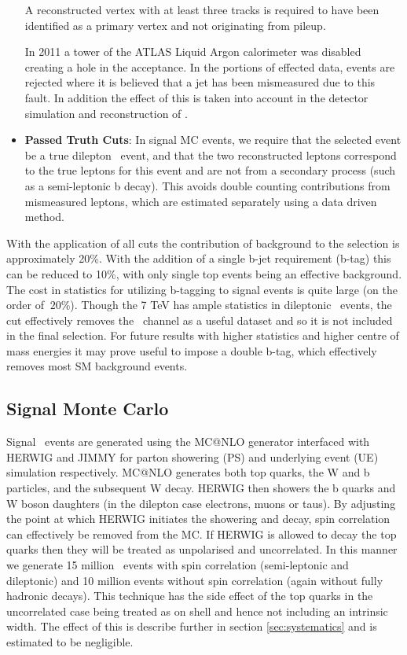 \begin{itemize}
A reconstructed vertex with at least three tracks is required to have been identified as a primary vertex and not originating from pileup. 

In 2011 a tower of the ATLAS Liquid Argon calorimeter was disabled creating a hole in the acceptance. In the portions of effected data, events are rejected where it is believed that a jet has been mismeasured due to this fault. In addition the effect of this is taken into account in the detector simulation and reconstruction of \etmiss .

  \item \textbf{Passed Truth Cuts}: In signal MC events, we require that the selected event be a true dilepton \ttbar\ event, and that the two reconstructed leptons correspond to the true leptons for this event and are not from a secondary process (such as a semi-leptonic b decay). This avoids double counting contributions from mismeasured leptons, which are estimated separately using a data driven method. 

\end{itemize}

With the application of all cuts the contribution of background to the selection is approximately 20\%. With the addition of a single b-jet requirement (b-tag) this can be reduced to 10\%, with only single top events being an effective background. The cost in statistics for utilizing b-tagging  to signal events is quite large (on the order of $~20$\%). Though the 7 TeV has ample statistics in dileptonic \ttbar\ events, the cut effectively removes the \ee\ channel as a useful dataset and so it is not included in the final selection. For future results with higher statistics and higher centre of mass energies it may prove useful to impose a double b-tag, which effectively removes most SM background events. 

\subsection{Signal Monte Carlo}
Signal \ttbar\ events are generated using the MC@NLO generator interfaced with HERWIG and JIMMY for parton showering (PS) and underlying event (UE) simulation respectively. MC@NLO generates both top quarks, the W and b particles, and the subsequent W decay. HERWIG then showers the b quarks and W boson daughters (in the dilepton case electrons, muons or taus). By adjusting the point at which HERWIG initiates the showering and decay, spin correlation can effectively be removed from the MC. If HERWIG is allowed to decay the top quarks then they will be treated as unpolarised and uncorrelated. In this manner we generate 15 million \ttbar\ events with spin correlation (semi-leptonic and dileptonic) and 10 million events without spin correlation (again without fully hadronic decays). This technique has the side effect of the top quarks in the uncorrelated case being treated as on shell and hence not including an intrinsic width. The effect of this is describe further in section \ref{sec:systematics} and is estimated to be negligible.

